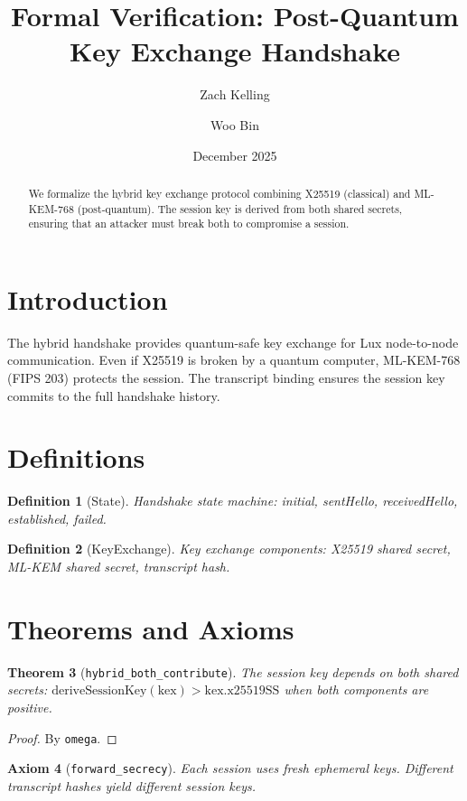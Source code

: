 \documentclass[11pt]{article}
\title{Formal Verification: Post-Quantum Key Exchange Handshake}
\author{Zach Kelling \and Woo Bin}
\date{December 2025}
\newtheorem{theorem}{Theorem}
\newtheorem{definition}[theorem]{Definition}
\newtheorem{axiom_stmt}[theorem]{Axiom}
\begin{document}
\maketitle

\begin{abstract}
We formalize the hybrid key exchange protocol combining X25519 (classical) and ML-KEM-768 (post-quantum). The session key is derived from both shared secrets, ensuring that an attacker must break both to compromise a session.
\end{abstract}

\section{Introduction}
The hybrid handshake provides quantum-safe key exchange for Lux node-to-node communication. Even if X25519 is broken by a quantum computer, ML-KEM-768 (FIPS 203) protects the session. The transcript binding ensures the session key commits to the full handshake history.

\section{Definitions}
\begin{definition}[State]
Handshake state machine: initial, sentHello, receivedHello, established, failed.
\end{definition}

\begin{definition}[KeyExchange]
Key exchange components: X25519 shared secret, ML-KEM shared secret, transcript hash.
\end{definition}


\section{Theorems and Axioms}
\begin{theorem}[\texttt{hybrid\_both\_contribute}]
The session key depends on both shared secrets: $\text{deriveSessionKey}(\text{kex}) > \text{kex.x25519SS}$ when both components are positive.
\end{theorem}
\begin{proof}
By \texttt{omega}.
\end{proof}

\begin{axiom_stmt}[\texttt{forward\_secrecy}]
Each session uses fresh ephemeral keys. Different transcript hashes yield different session keys.
\end{axiom_stmt}
\end{document}
